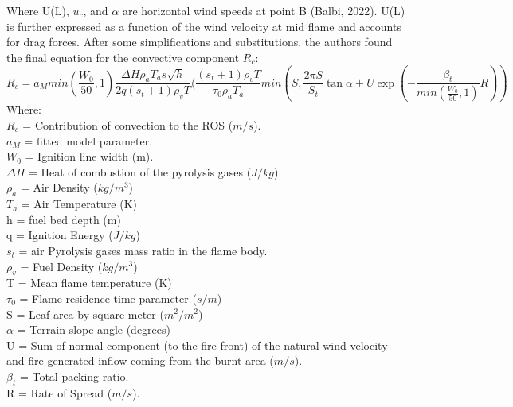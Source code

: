 \documentclass{article}
\begin{document}
Where U(L), $u_c$, and $\alpha$ are horizontal wind speeds at point B (Balbi, 2022). U(L) is further expressed as a function of the wind velocity at mid flame and accounts for drag forces. After some simplifications and substitutions, the authors found the final equation for the convective component $R_c$: \\
\begin{equation}
	\label{convective component}
	R_c = a_M min(\frac {W_0}{50}, 1) \frac {\Delta H \rho _ a T_a s \sqrt{h}}{2q(s_t + 1) \rho _ v T} (\frac {(s_t + 1) \rho _ v T}{\tau _ 0 \rho _ a T_a} min(S, \frac {2 \pi S}{S_t} \tan \alpha + U \exp (- \frac {\beta _ t}{min(\frac{W_0}{50}, 1)} R))
\end{equation}
Where: \\
$R_c$ = Contribution of convection to the ROS ($m/s$).\\
$a_M$ = fitted model parameter. \\
$W_0$ = Ignition line width (m). \\
$\Delta H$ = Heat of combustion of the pyrolysis gases ($J / kg$). \\
$\rho _ a$ = Air Density ($kg/m^3$) \\
$T_a$ = Air Temperature (K) \\
h = fuel bed depth (m) \\
q = Ignition Energy ($J / kg$) \\
$s_t$ = air Pyrolysis gases mass ratio in the flame body. \\
$\rho _ v$ = Fuel Density ($kg/m^3$) \\
T = Mean flame temperature (K)\\
$\tau _ 0$ = Flame residence time parameter ($s / m$) \\
S = Leaf area by square meter ($m^ 2 / m^2$) \\
$\alpha$ = Terrain slope angle (degrees)\\
U = Sum of normal component (to the fire front) of the natural wind velocity and fire generated inflow coming from the burnt area ($m / s$). \\
$\beta _ t$ = Total packing ratio. \\
R = Rate of Spread ($m / s$). \\
\end{document}
